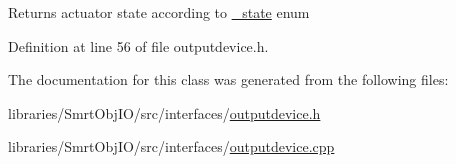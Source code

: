 \begin{DoxyReturn}{Returns}
actuator state according to \hyperlink{classsmrtobj_1_1io_1_1_output_device_a0c8010d79d7229137e4669f855c3e18b}{\+\_\+state} enum 
\end{DoxyReturn}


Definition at line 56 of file outputdevice.\+h.



The documentation for this class was generated from the following files\+:\begin{DoxyCompactItemize}
\item 
libraries/\+Smrt\+Obj\+I\+O/src/interfaces/\hyperlink{outputdevice_8h}{outputdevice.\+h}\item 
libraries/\+Smrt\+Obj\+I\+O/src/interfaces/\hyperlink{outputdevice_8cpp}{outputdevice.\+cpp}\end{DoxyCompactItemize}
